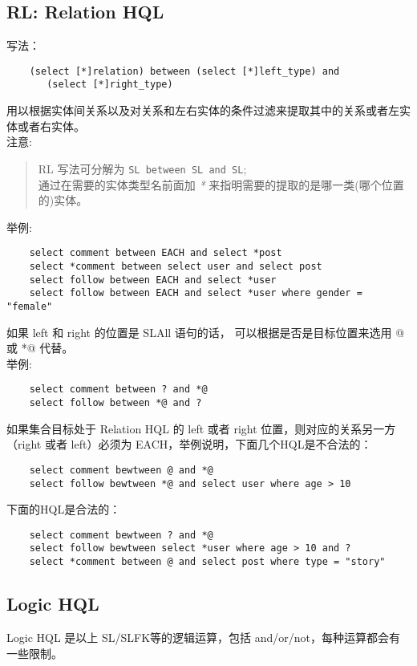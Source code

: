 \documentclass[10pt,a4paper]{article}
\begin{document}
\begin{CJK}{UTF8}{gbsn}
  \subsection{RL: Relation HQL}
  写法：
\begin{verbatim}
    (select [*]relation) between (select [*]left_type) and
       (select [*]right_type)
\end{verbatim}
  用以根据实体间关系以及对关系和左右实体的条件过滤来提取其中的关系或者左实体或者右实体。\\

  注意:
  \begin{quote}
    RL 写法可分解为 \texttt{SL between SL and SL};\\
    通过在需要的实体类型名前面加 \emph{*} 来指明需要的提取的是哪一类(哪个位置的)实体。
  \end{quote}

  举例:
\begin{verbatim}
    select comment between EACH and select *post
    select *comment between select user and select post
    select follow between EACH and select *user
    select follow between EACH and select *user where gender = "female"
\end{verbatim}

  如果 left 和 right 的位置是 SLAll 语句的话， 可以根据是否是目标位置来选用 @ 或 *@ 代替。\\

  举例:
\begin{verbatim}
    select comment between ? and *@
    select follow between *@ and ?
\end{verbatim}

  如果集合目标处于 Relation HQL 的 left 或者 right 位置，则对应的关系另一方（right 或者 left）必须为 EACH，举例说明，下面几个HQL是不合法的：
\begin{verbatim}
    select comment bewtween @ and *@
    select follow bewtween *@ and select user where age > 10
\end{verbatim}

  下面的HQL是合法的：

\begin{verbatim}
    select comment bewtween ? and *@
    select follow bewtween select *user where age > 10 and ?
    select *comment between @ and select post where type = "story"
\end{verbatim}

  \subsection{Logic HQL}
  Logic HQL 是以上 SL/SLFK等的逻辑运算，包括 and/or/not，每种运算都会有一些限制。


\end{CJK}
\end{document}

